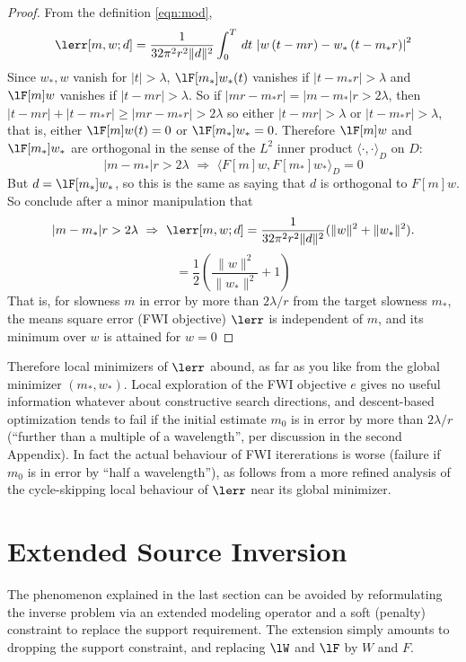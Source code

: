 \begin{proof} From the definition \ref{eqn:mod},
\[
 \lerr[m,w;d] =  \frac{1}{32\pi^2
    r^2\|d\|^2}\int_0^T\,dt\,\left|w\left(t-mr\right)-w_*\left(t-m_*r\right)\right|^2
\]
Since $w_*, w$ vanish for $|t|>\lambda$,
$\lF[m_*]w_*(t)$ vanishes if $|t-m_*r|>\lambda$ and $\lF[m]w$ vanishes if $|t-mr|>\lambda$. So if $|mr-m_*r|
= |m-m_*|r > 2\lambda$, then $|t-mr|+|t-m_*r| \ge |mr-m_*r| >
2\lambda$ so either $|t-mr|>\lambda$ or $|t-m_*r|>\lambda$, that is,
either $\lF[m]w(t)=0$ or $\lF[m_*]w_*=0$. Therefore $\lF[m]w$ and
$\lF[m_*]w_*$ are orthogonal in the sense of the $L^2$ inner product
$\langle \cdot,\cdot \rangle_D$ on $D$:
\begin{equation}
  \label{eqn:ortho}
  |m- m_*|r > 2\lambda \,\, \Rightarrow \,\, \langle F[m]w,
  F[m_*]w_*\rangle_D = 0
\end{equation}
But $d = \lF[m_*]w_*$, so this is the same as saying that $d$ is
orthogonal to $F[m]w$. So conclude after a minor manipulation that
\[
  |m- m_*|r > 2\lambda \,\, \Rightarrow \,\, \lerr[m,w;d]=\frac{1}{32\pi^2 
    r^2\|d\|^2}(\|w\|^2 + \|w_*\|^2).
\]
\begin{equation}
  \label{eqn:iso}
  = \frac{1}{2}\left(\frac{\|w\|^2}{\|w_*\|^2} + 1 \right)
\end{equation}
That is, for slowness $m$ in error by more than $2\lambda/r$ from the 
target slowness $m_*$, the means square error (FWI objective) $\lerr$ is independent of
$m$, and its minimum over $w$ is attained for $w=0$
\end{proof}

Therefore local minimizers of $\lerr$ abound, as far as you like from the
global minimizer $(m_*,w_*)$. Local exploration of the FWI objective
$e$ gives no useful information whatever about constructive search
directions, and descent-based optimization tends to fail if the
initial estimate $m_0$ is in error by more than $2\lambda/r$
(``further than a multiple of a wavelength'', per discussion
in the second Appendix). In fact the actual behaviour of FWI itererations is worse
(failure if $m_0$ is in error by ``half a wavelength''), as follows
from a more refined analysis of the cycle-skipping local behaviour of $\lerr$ near its
global minimizer.

\section{Extended Source Inversion}
The phenomenon explained in the last section can be avoided by
reformulating the inverse problem via an extended modeling operator
and a soft (penalty) constraint to replace the support
requirement. The extension simply amounts to dropping the support
constraint, and replacing $\lW$ and $\lF$ by $W$ and $F$.

